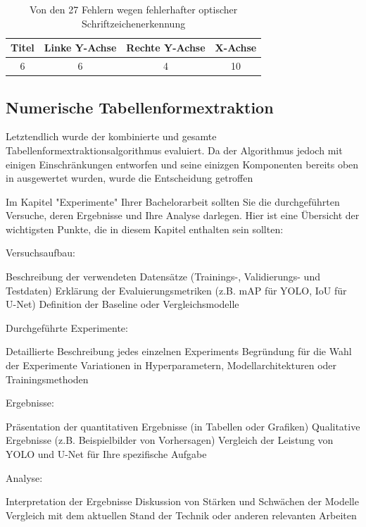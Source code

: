 \begin{table}[h!]
    \centering
    \begin{tabular}{|c|c|c|c|}
        \hline
        \rowcolor[HTML]{EFEFEF}
        Titel & Linke Y-Achse & Rechte Y-Achse & X-Achse \\ \hline
        6     & 6             & 4              & 10      \\ \hline
    \end{tabular}
    \caption{Von den 27 Fehlern wegen fehlerhafter optischer Schriftzeichenerkennung}
    \label{tb:ocr2}
\end{table}

\subsection{Numerische Tabellenformextraktion}

Letztendlich wurde der kombinierte und gesamte Tabellenformextraktionsalgorithmus evaluiert. Da der Algorithmus jedoch mit einigen Einschränkungen entworfen und seine einizgen Komponenten bereits oben in ausgewertet wurden, wurde die Entscheidung getroffen



Im Kapitel "Experimente" Ihrer Bachelorarbeit sollten Sie die durchgeführten Versuche, deren Ergebnisse und Ihre Analyse darlegen. Hier ist eine Übersicht der wichtigsten Punkte, die in diesem Kapitel enthalten sein sollten:

Versuchsaufbau:

Beschreibung der verwendeten Datensätze (Trainings-, Validierungs- und Testdaten)
Erklärung der Evaluierungsmetriken (z.B. mAP für YOLO, IoU für U-Net)
Definition der Baseline oder Vergleichsmodelle


Durchgeführte Experimente:

Detaillierte Beschreibung jedes einzelnen Experiments
Begründung für die Wahl der Experimente
Variationen in Hyperparametern, Modellarchitekturen oder Trainingsmethoden


Ergebnisse:

Präsentation der quantitativen Ergebnisse (in Tabellen oder Grafiken)
Qualitative Ergebnisse (z.B. Beispielbilder von Vorhersagen)
Vergleich der Leistung von YOLO und U-Net für Ihre spezifische Aufgabe


Analyse:

Interpretation der Ergebnisse
Diskussion von Stärken und Schwächen der Modelle
Vergleich mit dem aktuellen Stand der Technik oder anderen relevanten Arbeiten



